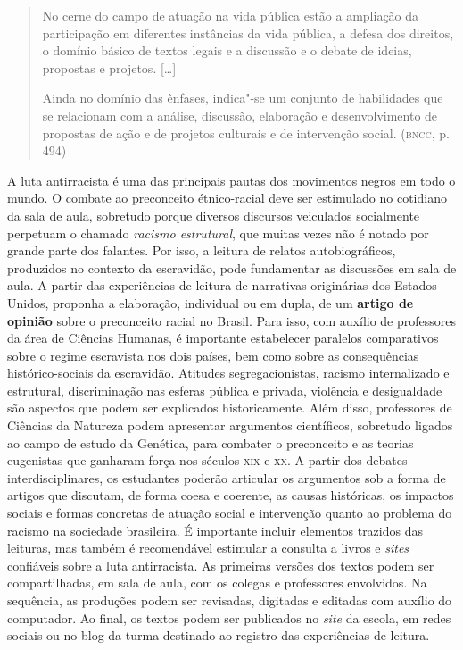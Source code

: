 \documentclass[11pt]{extarticle}
\begin{document}
\begin{enumerate}
\begin{quote}
No cerne do campo de atuação na vida pública estão a ampliação da
participação em diferentes instâncias da vida pública, a defesa dos
direitos, o domínio básico de textos legais e a discussão e o debate de
ideias, propostas e projetos. {[}\ldots{}{]}

Ainda no domínio das ênfases, indica"-se um conjunto de habilidades que
se relacionam com a análise, discussão, elaboração e desenvolvimento de
propostas de ação e de projetos culturais e de intervenção social.
(\textsc{bncc}, p. 494)
\end{quote}

A luta antirracista é uma das principais pautas dos movimentos negros
em todo o mundo. O combate ao preconceito étnico-racial deve ser
estimulado no cotidiano da sala de aula, sobretudo porque diversos
discursos veiculados socialmente perpetuam o chamado \emph{racismo
estrutural}, que muitas vezes não é notado por grande parte dos
falantes. Por isso, a leitura de relatos autobiográficos, produzidos
no contexto da escravidão, pode fundamentar as discussões em sala de
aula. A partir das experiências de leitura de narrativas originárias
dos Estados Unidos, proponha a elaboração, individual ou em dupla, de
um \textbf{artigo de opinião} sobre o preconceito racial no Brasil.
Para isso, com auxílio de professores da área de Ciências Humanas, é
importante estabelecer paralelos comparativos sobre o regime
escravista nos dois países, bem como sobre as consequências
histórico-sociais da escravidão. Atitudes segregacionistas, racismo
internalizado e estrutural, discriminação nas esferas pública e
privada, violência e desigualdade são aspectos que podem ser
explicados historicamente. Além disso, professores de Ciências da
Natureza podem apresentar argumentos científicos, sobretudo ligados ao
campo de estudo da Genética, para combater o preconceito e as teorias
eugenistas que ganharam força nos séculos \textsc{xix} e \textsc{xx}. A partir dos
debates interdisciplinares, os estudantes poderão articular os
argumentos sob a forma de artigos que discutam, de forma coesa e
coerente, as causas históricas, os impactos sociais e formas concretas
de atuação social e intervenção quanto ao problema do racismo na
sociedade brasileira. É importante incluir elementos trazidos das
leituras, mas também é recomendável estimular a consulta a livros e
\emph{sites} confiáveis sobre a luta antirracista. As primeiras
versões dos textos podem ser compartilhadas, em sala de aula, com os
colegas e professores envolvidos. Na sequência, as produções podem ser
revisadas, digitadas e editadas com auxílio do computador. Ao final,
os textos podem ser publicados no \emph{site} da escola, em redes
sociais ou no blog da turma destinado ao registro das experiências de
leitura.



\end{enumerate}
\end{document}
